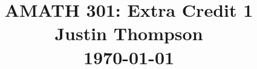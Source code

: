\documentclass{article}
\begin{document}
 
 
 
\title{
    \textmd{\textbf{AMATH 301: Extra Credit 1}}\\
    \vspace{0.1in}
    \textbf{Justin Thompson}\\
    \normalsize\vspace{0.1in}\today\\
    \date{}
}


\maketitle
\end{document}
